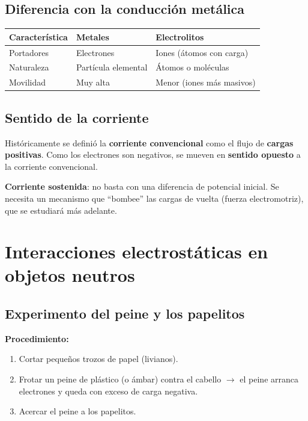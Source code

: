 \documentclass[12pt,a4paper]{article}
\begin{document}
\subsection{Diferencia con la conducción metálica}

\begin{center}
\begin{tabular}{lll}
\toprule
\textbf{Característica} & \textbf{Metales} & \textbf{Electrolitos} \\
\midrule
Portadores & Electrones & Iones (átomos con carga) \\
Naturaleza & Partícula elemental & Átomos o moléculas \\
Movilidad  & Muy alta & Menor (iones más masivos) \\
\bottomrule
\end{tabular}
\end{center}

\subsection{Sentido de la corriente}

Históricamente se definió la \textbf{corriente convencional} como el
flujo de \textbf{cargas positivas}. Como los electrones son negativos,
se mueven en \textbf{sentido opuesto} a la corriente convencional.

\textbf{Corriente sostenida}: no basta con una diferencia de potencial
inicial. Se necesita un mecanismo que ``bombee'' las cargas de vuelta
(fuerza electromotriz), que se estudiará más adelante.

\section{Interacciones electrostáticas en objetos neutros}

\subsection{Experimento del peine y los papelitos}

\textbf{Procedimiento:}
\begin{enumerate}[nosep]
  \item Cortar pequeños trozos de papel (livianos).
  \item Frotar un peine de plástico (o ámbar) contra el cabello
        $\to$ el peine arranca electrones y queda con exceso de carga
        negativa.
  \item Acercar el peine a los papelitos.
\end{enumerate}
\end{document}
